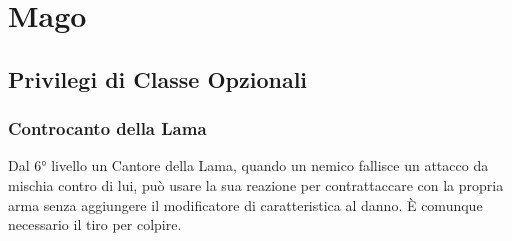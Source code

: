 \chapter{Mago}

\section{Privilegi di Classe Opzionali}

\subsection{Controcanto della Lama}

Dal 6° livello un Cantore della Lama, quando un nemico fallisce un attacco da mischia contro di lui, può usare la sua reazione per contrattaccare con la propria arma senza aggiungere il modificatore di caratteristica al danno. È comunque necessario il tiro per colpire.